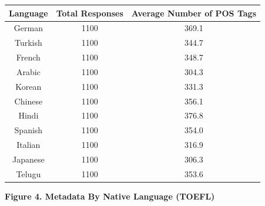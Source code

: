 \documentclass[12pt]{article}
\begin{document}
  \begin{center}
  	\begin{tabular}{|c|c|c|}
  		\hline
  		\textbf{Language} & \textbf{Total Responses} & \textbf{Average Number of POS Tags}\\
  		\hline
  		German & 1100 & 369.1\\
  		\hline
  		Turkish & 1100 & 344.7\\
  		\hline
  		French & 1100 & 348.7\\
  		\hline
  		Arabic & 1100& 304.3\\
  		\hline
  		Korean & 1100& 331.3\\
  		\hline
  		Chinese & 1100 & 356.1\\
  		\hline
  		Hindi & 1100& 376.8\\
  		\hline
  		Spanish & 1100 & 354.0\\
  		\hline
  		Italian & 1100 & 316.9\\
  		\hline
  		Japanese & 1100 & 306.3\\
  		\hline
  		Telugu & 1100 & 353.6\\
  		\hline
  	\end{tabular}
  	\textbf{Figure 4. Metadata By Native Language (TOEFL)}
  \end{center}
\end{document}
